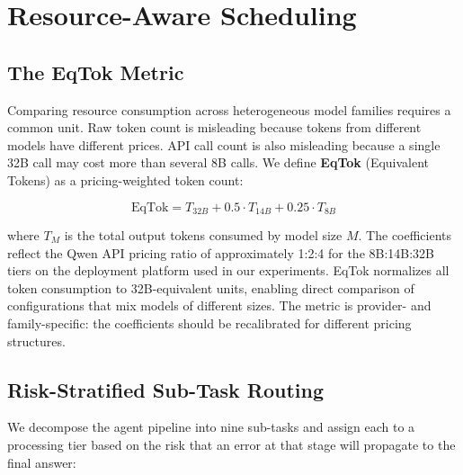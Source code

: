 \documentclass[letterpaper]{article} %
\begin{document}
\section{Resource-Aware Scheduling}
\label{sec:resource}

\subsection{The EqTok Metric}

Comparing resource consumption across heterogeneous model families requires a common unit. Raw token count is misleading because tokens from different models have different prices. API call count is also misleading because a single 32B call may cost more than several 8B calls. We define \textbf{EqTok} (Equivalent Tokens) as a pricing-weighted token count:

\begin{equation}
\mathrm{EqTok} = T_{32B} + 0.5 \cdot T_{14B} + 0.25 \cdot T_{8B}
\label{eq:eqtok}
\end{equation}

where $T_{M}$ is the total output tokens consumed by model size $M$. The coefficients reflect the Qwen API pricing ratio of approximately 1:2:4 for the 8B:14B:32B tiers on the deployment platform used in our experiments. EqTok normalizes all token consumption to 32B-equivalent units, enabling direct comparison of configurations that mix models of different sizes. The metric is provider- and family-specific: the coefficients should be recalibrated for different pricing structures.

\subsection{Risk-Stratified Sub-Task Routing}

We decompose the agent pipeline into nine sub-tasks and assign each to a processing tier based on the risk that an error at that stage will propagate to the final answer:
\end{document}
